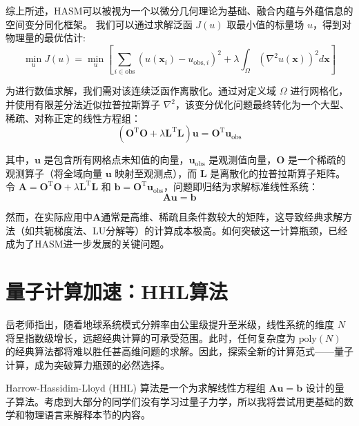 \documentclass[12pt, a4paper]{article}
\newcommand{\ivec}[1]{\bm{#1}}                  %
\newcommand{\pos}{\ivec{x}}                     %
\newcommand{\scalarfield}{u}                    %
\newcommand{\domain}{\Omega}                    %
\newcommand{\laplacian}{\nabla^2}       %
\newcommand{\mat}[1]{\mathbf{#1}}               %
\newcommand{\transpose}[1]{{#1}^{\mathrm{T}}}   %
\begin{document}
综上所述，HASM可以被视为一个以微分几何理论为基础、融合内蕴与外蕴信息的空间变分同化框架。
我们可以通过求解泛函 $J(\scalarfield)$ 取最小值的标量场 $\scalarfield$，得到对物理量的最优估计:
\begin{equation}
    \min_{\scalarfield} J(\scalarfield) = \min_{\scalarfield} \left[ \sum_{i \in \text{obs}} \left( \scalarfield(\pos_i) - \scalarfield_{\text{obs},i} \right)^2 + \lambda \int_{\domain} \left( \laplacian \scalarfield(\pos) \right)^2 d\pos \right]
\end{equation}

为进行数值求解，我们需对该连续泛函作离散化。通过对定义域 $\domain$ 进行网格化，并使用有限差分法近似拉普拉斯算子 $\laplacian$，该变分优化问题最终转化为一个大型、稀疏、对称正定的线性方程组：
\begin{equation}
    (\transpose{\mat{O}} \mat{O} + \lambda \transpose{\mat{L}} \mat{L}) \ivec{\scalarfield} = \transpose{\mat{O}} \ivec{\scalarfield}_{\text{obs}}
\end{equation}

其中，$\ivec{\scalarfield}$ 是包含所有网格点未知值的向量，$\ivec{\scalarfield}_{\text{obs}}$ 是观测值向量，$\mat{O}$ 是一个稀疏的观测算子（将全域向量 $\ivec{\scalarfield}$ 映射至观测点），而 $\mat{L}$ 是离散化的拉普拉斯算子矩阵。令 $\mat{A} = \mat{O}^\mathrm{T} \mat{O} + \lambda \mat{L}^\mathrm{T} \mat{L}$ 和 $\ivec{b} = \mat{O}^\mathrm{T} \ivec{\scalarfield}_{\text{obs}}$，问题即归结为求解标准线性系统：
\begin{equation}
    \mat{A}\ivec{\scalarfield} = \ivec{b}
\end{equation}

然而，在实际应用中$\mat{A}$通常是高维、稀疏且条件数较大的矩阵，这导致经典求解方法（如共轭梯度法、LU分解等）的计算成本极高。如何突破这一计算瓶颈，已经成为了HASM进一步发展的关键问题。



\section{量子计算加速：HHL算法}

岳老师指出，随着地球系统模式分辨率由公里级提升至米级，线性系统的维度 $N$ 将呈指数级增长，远超经典计算的可承受范围。此时，任何复杂度为 $\text{poly}(N)$ 的经典算法都将难以胜任甚高维问题的求解。因此，探索全新的计算范式——量子计算，成为突破算力瓶颈的必然选择。

Harrow-Hassidim-Lloyd (HHL) 算法是一个为求解线性方程组 $\mat{A}\ivec{\scalarfield} = \ivec{b}$ 设计的量子算法。考虑到大部分的同学们没有学习过量子力学，所以我将尝试用更基础的数学和物理语言来解释本节的内容。
\end{document}
